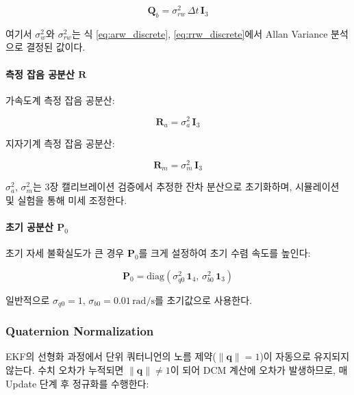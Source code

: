 \begin{equation}
    \mathbf{Q}_b = \sigma_{rw}^2\,\Delta t\,\mathbf{I}_3
    \label{eq:ekf_Qb}
\end{equation}

\noindent 여기서 $\sigma_w^2$와 $\sigma_{rw}^2$는 식 \eqref{eq:arw_discrete},
\eqref{eq:rrw_discrete}에서 Allan Variance 분석으로 결정된 값이다.

\paragraph{측정 잡음 공분산 $\mathbf{R}$}

가속도계 측정 잡음 공분산:

\begin{equation}
    \mathbf{R}_a = \sigma_a^2\,\mathbf{I}_3
    \label{eq:ekf_Ra}
\end{equation}

지자기계 측정 잡음 공분산:

\begin{equation}
    \mathbf{R}_m = \sigma_m^2\,\mathbf{I}_3
    \label{eq:ekf_Rm}
\end{equation}

$\sigma_a^2$, $\sigma_m^2$는 3장 캘리브레이션 검증에서 추정한 잔차 분산으로 초기화하며,
시뮬레이션 및 실험을 통해 미세 조정한다.

\paragraph{초기 공분산 $\mathbf{P}_0$}

초기 자세 불확실도가 큰 경우 $\mathbf{P}_0$를 크게 설정하여
초기 수렴 속도를 높인다:

\begin{equation}
    \mathbf{P}_0 = \text{diag}\left(\sigma_{q0}^2\,\mathbf{1}_4,\, \sigma_{b0}^2\,\mathbf{1}_3\right)
    \label{eq:ekf_P0}
\end{equation}

일반적으로 $\sigma_{q0} = 1$, $\sigma_{b0} = 0.01\,\text{rad/s}$를 초기값으로 사용한다.

\subsubsection{Quaternion Normalization}

EKF의 선형화 과정에서 단위 쿼터니언의 노름 제약($\|\mathbf{q}\| = 1$)이
자동으로 유지되지 않는다.
수치 오차가 누적되면 $\|\mathbf{q}\| \neq 1$이 되어 DCM 계산에 오차가 발생하므로,
매 Update 단계 후 정규화를 수행한다:


